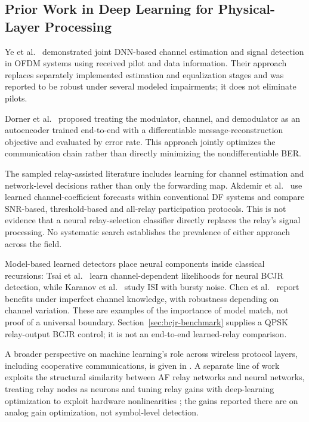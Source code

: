 \subsection{Prior Work in Deep Learning for Physical-Layer Processing}\label{sec:prior-work-in-deep-learning-for-physical-layer-processing}

Ye et al.~\cite{YeLiJuang2018OFDMDL} demonstrated joint DNN-based channel estimation and signal detection in OFDM systems using received pilot and data information. Their approach replaces separately implemented estimation and equalization stages and was reported to be robust under several modeled impairments; it does not eliminate pilots.

Dorner et al.~\cite{Dorner2018OverTheAirDL} proposed treating the modulator, channel, and demodulator as an autoencoder trained end-to-end with a differentiable message-reconstruction objective and evaluated by error rate. This approach jointly optimizes the communication chain rather than directly minimizing the nondifferentiable BER.

The sampled relay-assisted literature includes learning for channel estimation and network-level decisions rather than only the forwarding map. Akdemir et al.~\cite{Akdemir2024DLRelaySelection} use learned channel-coefficient forecasts within conventional DF systems and compare SNR-based, threshold-based and all-relay participation protocols. This is not evidence that a neural relay-selection classifier directly replaces the relay's signal processing. No systematic search establishes the prevalence of either approach across the field.

Model-based learned detectors place neural components inside classical recursions: Tsai et al.~\cite{TsaiTeng2020BCJRNet} learn channel-dependent likelihoods for neural BCJR detection, while Karanov et al.~\cite{Karanov2024BurstyISI} study ISI with bursty noise. Chen et al.~\cite{Chen2024BCJRNetRobustness} report benefits under imperfect channel knowledge, with robustness depending on channel variation. These are examples of the importance of model match, not proof of a universal boundary. Section~\ref{sec:bcjr-benchmark} supplies a QPSK relay-output BCJR control; it is not an end-to-end learned-relay comparison.

A broader perspective on machine learning's role across wireless protocol layers, including cooperative communications, is given in \cite{Gunduz2019MLAir}. A separate line of work exploits the structural similarity between AF relay networks and neural networks, treating relay nodes as neurons and tuning relay gains with deep-learning optimization to exploit hardware nonlinearities \cite{Bergel2023RelaysAsNeurons,BergelICASSP2024}; the gains reported there are on analog gain optimization, not symbol-level detection.

